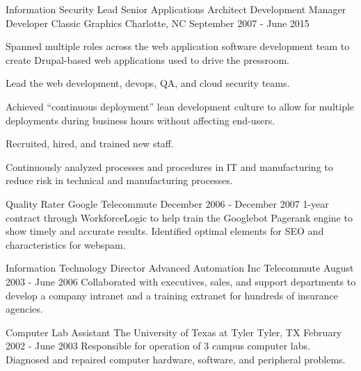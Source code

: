 \begin{cventries}

\cventry
{Information Security Lead \newline {\vspace{-.75mm}}
Senior Applications Architect \newline {\vspace{-.75mm}}
Development Manager \newline {\vspace{-.75mm}}
Developer}
{Classic Graphics} %
{Charlotte, NC} %
{September 2007 - June 2015} %
{
Spanned multiple roles across the web application software development team to create Drupal-based web applications used to drive the pressroom.
\begin{cvitems}
\item[]
\item {Lead the web development, devops, QA, and cloud security teams.}
\item {Achieved “continuous deployment” lean development culture to allow for multiple deployments during business hours without affecting end-users.}
\item {Recruited, hired, and trained new staff.}
\item {Continuously analyzed processes and procedures in IT and manufacturing to reduce risk in technical and manufacturing processes.}
\end{cvitems}
}


\cventry
{Quality Rater}
{Google}
{Telecommute}
{December 2006 - December 2007} %
{ %
1-year contract through WorkforceLogic to help train the Googlebot Pagerank engine to show timely and accurate results. Identified optimal elements for SEO and characteristics for webspam.
}


\cventry
{Information Technology Director}
{Advanced Automation Inc}
{Telecommute}
{August 2003 - June 2006} %
{ %
Collaborated with executives, sales, and support departments to develop a company intranet and a training extranet for hundreds of insurance agencies.
}


\cventry
{Computer Lab Assistant}
{The University of Texas at Tyler}
{Tyler, TX}
{February 2002 - June 2003} %
{ %
Responsible for operation of 3 campus computer labs. Diagnosed and repaired computer hardware, software, and peripheral problems.
}


\end{cventries}
